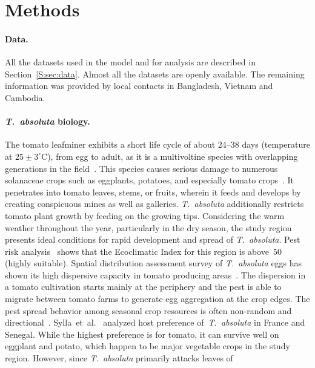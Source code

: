 \documentclass[11pt]{article}
\newcommand{\tuta}{\emph{T.~absoluta}}
\theoremstyle{definition}
\begin{document}
\section{Methods}
\paragraph{Data.} All the datasets used in the model and for analysis are
described in Section~\ref{S:sec:data}. Almost
all the datasets are openly available. The remaining information was
provided by local contacts in Bangladesh, Vietnam and Cambodia.
\paragraph{\tuta{} biology.}
The tomato leafminer exhibits a short life cycle of about 24--38 days
(temperature at $25\pm3^\circ$C), from egg to adult, as it is a
multivoltine species with overlapping generations in the
field~\cite{guedes2012tomato}. This species causes serious damage to
numerous solanaceae crops such as eggplants, potatoes, and especially
tomato crops~\cite{sylla2018}. It penetrates into tomato leaves, stems, or
fruits, wherein it feeds and develops by creating conspicuous mines as well
as galleries. \tuta{} additionally restricts tomato plant growth by feeding
on the growing tips. Considering the warm weather throughout the year,
particularly in the dry season, the study region presents ideal conditions
for rapid development and spread of \tuta{}. Pest risk
analysis~\cite{tonnang2015identification} shows that the Ecoclimatic Index
for this region is above~$50$ (highly suitable). Spatial distribution
assessment survey of \tuta{} eggs has shown its high dispersive capacity in
tomato producing areas~\cite{martins2018assessing}. The dispersion in a
tomato cultivation starts mainly at the periphery and
the pest is able to migrate between tomato farms to generate egg aggregation at the
crop edges. The pest spread behavior among seasonal crop resources
is often non-random and directional~\cite{martins2018assessing}.
Sylla~et~al.~\cite{sylla2018} analyzed host preference of~\tuta{} in France
and Senegal. While the highest preference is for tomato, it can survive
well on eggplant and potato, which happen to be major vegetable crops in
the study region. However, since \tuta{} primarily attacks leaves of
\end{document}
